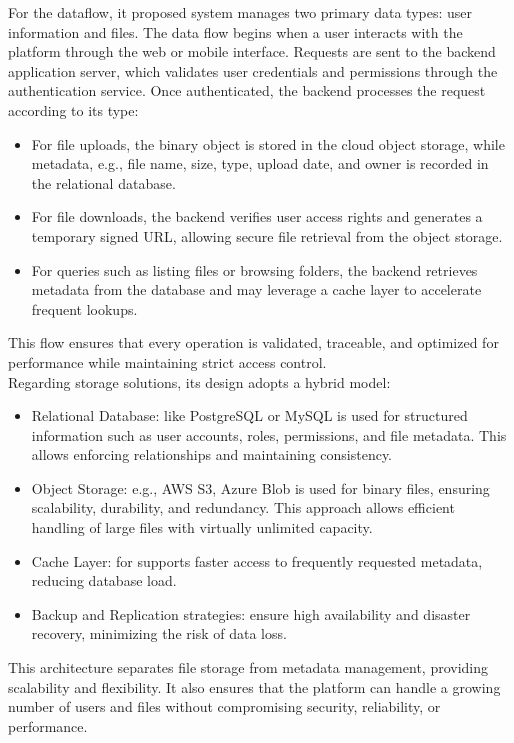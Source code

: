 For the dataflow, it proposed system manages two primary data types: user information and files. The data flow begins when a user interacts with the platform through the web or mobile interface. Requests are sent to the backend application server, which validates user credentials and permissions through the authentication service. Once authenticated, the backend processes the request according to its type:\\

\begin{itemize}
    \item For file uploads, the binary object is stored in the cloud object storage, while metadata, e.g., file name, size, type, upload date, and owner is recorded in the relational database.
    \item For file downloads, the backend verifies user access rights and generates a temporary signed URL, allowing secure file retrieval from the object storage.
    \item For queries such as listing files or browsing folders, the backend retrieves metadata from the database and may leverage a cache layer to accelerate frequent lookups.
\end{itemize}

This flow ensures that every operation is validated, traceable, and optimized for performance while maintaining strict access control. \\

Regarding storage solutions, its design adopts a hybrid model:

\begin{itemize}
    \item Relational Database: like PostgreSQL or MySQL is used for structured information such as user accounts, roles, permissions, and file metadata. This allows enforcing relationships and maintaining consistency.
    \item Object Storage: e.g., AWS S3, Azure Blob is used for binary files, ensuring scalability, durability, and redundancy. This approach allows efficient handling of large files with virtually unlimited capacity.
    \item Cache Layer: for supports faster access to frequently requested metadata, reducing database load.
    \item Backup and Replication strategies: ensure high availability and disaster recovery, minimizing the risk of data loss.
\end{itemize}

This architecture separates file storage from metadata management, providing scalability and flexibility. It also ensures that the platform can handle a growing number of users and files without compromising security, reliability, or performance.
